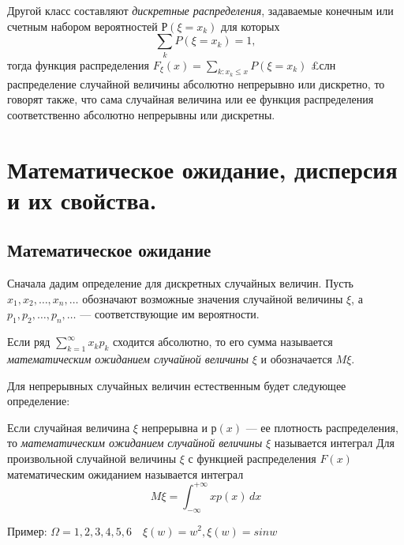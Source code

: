 Другой класс составляют \textit{дискретные распределения}, задаваемые конечным или счетным набором вероятностей $Р(\xi=x_k)$ для которых
$$
\sum\limits_k P(\xi=x_k)=1,
$$
тогда функция распределения $F_\xi(x)=\sum\limits_{k: x_k \le x} P(\xi=x_k)$
£слн распределение случайной величины абсолютно непрерывно или дискретно, то говорят также, что сама случайная величина или ее функция распределения соответственно абсолютно непрерывны или дискретны.

\section{Математическое ожидание, дисперсия и их свойства.}
\subsection{Математическое ожидание}

Сначала дадим определение для дискретных случайных величин. Пусть $x_1,x_2,\dots,x_n,\dots$ обозначают возможные значения случайной величины $\xi$, а $p_1,p_2,\dots,p_n,\dots$ --- соответствующие им вероятности.
\begin{defn}
Если ряд $\sum\limits_{k=1}^{\infty}x_k p_k$ сходится абсолютно, то его сумма называется \textit{математическим ожиданием случайной величины} $\xi$ и обозначается $M\xi$.
\end{defn}
Для непрерывных случайных величин естественным будет следующее определение: 
\begin{defn} 
Если случайная величина $\xi$ непрерывна и $р(x)$ --- ее плотность распределения, то \textit{математическим ожиданием} \textit{случайной величины} $\xi$ называется интеграл Для произвольной случайной величины $\xi$ с функцией распределения $F(x)$ математическим ожиданием называется интеграл
\begin{equation}
M\xi=\int_{-\infty}^{+\infty} xp(x)\,dx
\end{equation}
\end{defn}





















Пример:
$\Omega={1,2,3,4,5,6}\quad \xi(w)=w^2, \xi(w)=sinw$ 

